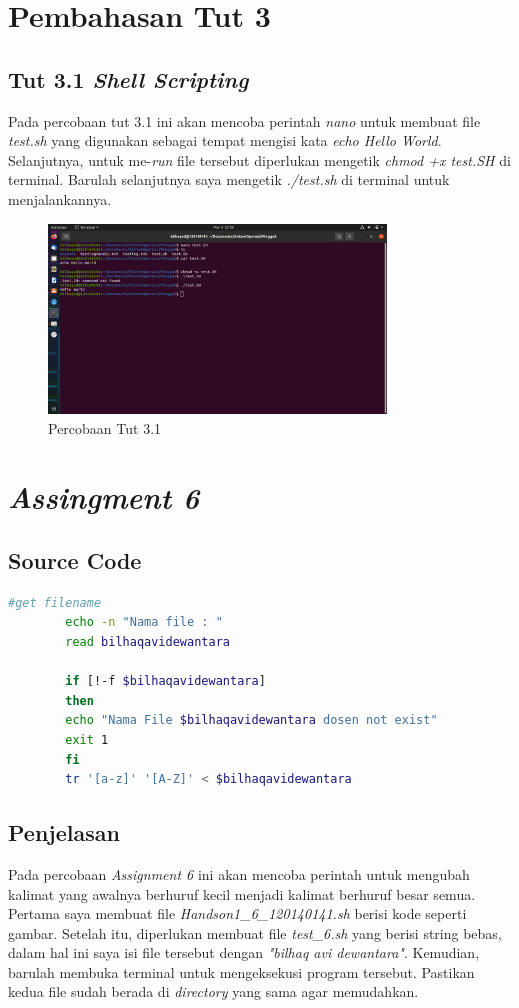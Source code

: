 \documentclass[11pt,a4paper]{article}
\begin{document}
\section{Pembahasan Tut 3}
\subsection{Tut 3.1 \textit{Shell Scripting}}
	Pada percobaan tut 3.1 ini akan mencoba perintah \textit{nano} untuk membuat file \textit{test.sh} yang digunakan sebagai tempat mengisi
	kata \textit{echo Hello World}. Selanjutnya, untuk me-\textit{run} file tersebut diperlukan mengetik \textit{chmod +x test.SH} di terminal. Barulah 
	selanjutnya saya mengetik \textit{./test.sh} di terminal untuk menjalankannya.
	
	\begin{figure}[h]
		\centering
		\includegraphics[width=0.8\textwidth]{Figure/tut 3.png}
		\caption{Percobaan Tut 3.1}
	\end{figure}

\section{\textit{Assingment 6}}
\subsection*{Source Code}
\begin{lstlisting}[language=bash]
		#get filename
		echo -n "Nama file : "
		read bilhaqavidewantara

		if [!-f $bilhaqavidewantara]
		then
		echo "Nama File $bilhaqavidewantara dosen not exist"
		exit 1
		fi
		tr '[a-z]' '[A-Z]' < $bilhaqavidewantara 
	\end{lstlisting}
	
\subsection*{Penjelasan}
	Pada percobaan \textit{Assignment 6} ini akan mencoba perintah untuk mengubah kalimat yang awalnya berhuruf kecil menjadi 
	kalimat berhuruf besar semua. Pertama saya membuat file \textit{Handson1\_6\_120140141.sh} berisi kode seperti gambar.
	Setelah itu, diperlukan membuat file \textit{test\_6.sh} yang berisi string bebas, dalam hal ini saya isi file tersebut dengan 
	\textit{"bilhaq avi dewantara"}. Kemudian, barulah membuka terminal untuk mengeksekusi program tersebut.
	Pastikan kedua file sudah berada di \textit{directory} yang sama agar memudahkan.
	
\end{document}
